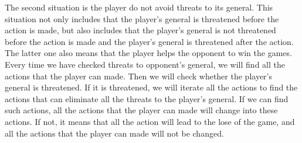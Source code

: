 The second situation is the player do not avoid threats to its general. 
This situation not only includes that the player's general is threatened before the action is made, but also includes that the player's general is not threatened before the action is made and the player's general is threatened after the action. 
The latter one also means that the player helps the opponent to win the games. 
Every time we have checked threats to opponent's general, we will find all the actions that the player can made. 
Then we will check whether the player's general is threatened. 
If it is threatened, we will iterate all the actions to find the actions that can eliminate all the threats to the player's general. 
If we can find such actions, all the actions that the player can made will change into these actions. 
If not, it means that all the action will lead to the lose of the game, and all the actions that the player can made will not be changed. 
